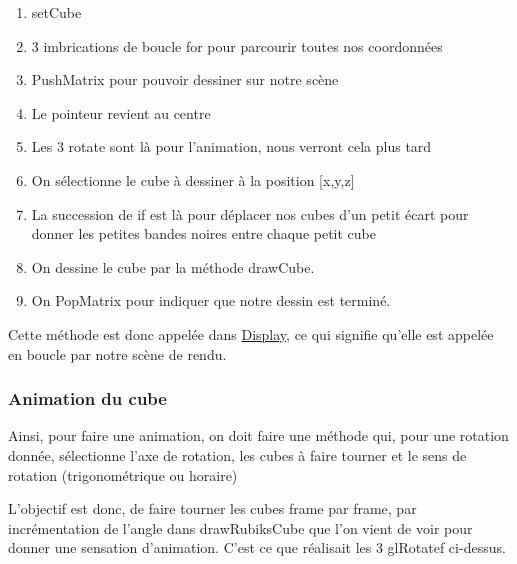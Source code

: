 \begin{enumerate}
    \item setCube
    \item 3 imbrications de boucle for pour parcourir toutes nos coordonnées
    \item PushMatrix pour pouvoir dessiner sur notre scène
    \item Le pointeur revient au centre
    \item Les 3 rotate sont là pour l’animation, nous verront cela plus tard
    \item On sélectionne le cube à dessiner à la position [x,y,z]
    \item La succession de if est là pour déplacer nos cubes d’un petit écart pour donner les petites bandes noires entre chaque petit cube
    \item On dessine le cube par la méthode drawCube.
    \item On PopMatrix pour indiquer que notre dessin est terminé.
\end{enumerate}

Cette méthode est donc appelée dans \underline{Display}, ce qui signifie qu’elle est appelée en boucle par notre scène de rendu.

\subsubsection{Animation du cube}
Ainsi, pour faire une animation, on doit faire une méthode qui, pour une rotation donnée, sélectionne l’axe de rotation, les cubes à faire tourner et le sens de rotation (trigonométrique ou horaire)

L’objectif est donc, de faire tourner les cubes frame par frame, par incrémentation de l’angle dans drawRubiksCube que l’on vient de voir pour donner une sensation d’animation. C’est ce que réalisait les 3 glRotatef ci-dessus.

